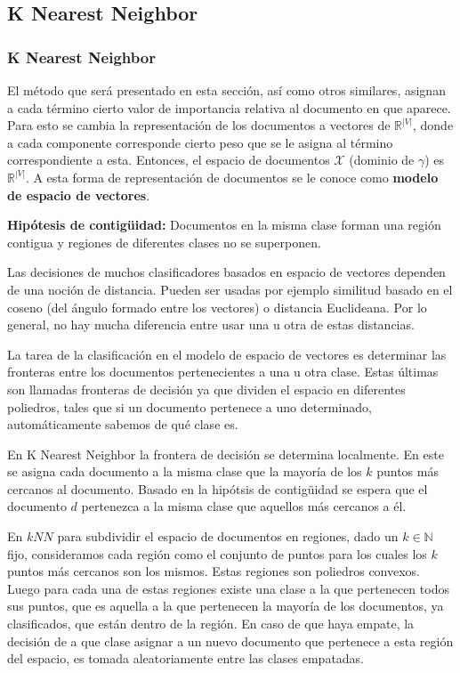 \documentclass[t,compress,10pt,xcolor=dvipsnames]{beamer}
\begin{document}
	\subsection{K Nearest Neighbor}
	\frame[allowframebreaks, c]
		\frametitle{K Nearest Neighbor}
				
		
			El m\'etodo que ser\'a presentado en esta secci\'on, as\'i como otros similares, asignan a cada t\'ermino cierto valor de importancia relativa al documento en que aparece. Para esto se cambia la representaci\'on de los documentos a vectores de $\mathbb{R}^{|V|}$, donde a cada componente corresponde cierto peso que se le asigna al t\'ermino correspondiente a esta. Entonces, el espacio de documentos $\mathcal{X}$ (dominio de $\gamma$) es $\mathbb{R}^{|V|}$. A esta forma de representaci\'on de documentos se le conoce como \textbf{modelo de espacio de vectores}.
			
		\framebreak		
			
			\textbf{Hip\'otesis de contig\"uidad:} Documentos en la misma clase forman una regi\'on contigua  y regiones de diferentes clases no se superponen.
			
		\framebreak	
				
			Las decisiones de muchos clasificadores basados en espacio de vectores dependen de una noci\'on de distancia. Pueden ser usadas por ejemplo similitud basado en el coseno (del \'angulo formado entre los vectores) o distancia Euclideana. Por lo general, no hay mucha diferencia entre usar una u otra de estas distancias.
			
		\framebreak	
						
			La tarea de la clasificaci\'on en el modelo de espacio de vectores es determinar las fronteras entre los documentos pertenecientes a una u otra clase. Estas \'ultimas son llamadas fronteras de decisi\'on ya que dividen el espacio en diferentes poliedros, tales que si un documento pertenece a uno determinado, autom\'aticamente sabemos de qu\'e clase es. 
			
		\framebreak	
						
			En K Nearest Neighbor la frontera de decisi\'on se determina localmente. En este se asigna cada documento a la misma clase que la mayor\'ia de los $k$ puntos m\'as cercanos al documento. Basado en la hip\'otsis de contig\"uidad se espera que el documento $d$ pertenezca a la misma clase que aquellos m\'as cercanos a \'el.
			
		\framebreak	
						
			En $kNN$ para subdividir el espacio de documentos en regiones, dado un $k \in \mathbb{N}$ fijo, consideramos cada regi\'on como el conjunto de puntos para los cuales los $k$ puntos m\'as cercanos son los mismos. Estas regiones son poliedros convexos. Luego para cada una de estas regiones existe una clase a la que pertenecen todos sus puntos, que es aquella a la que pertenecen la mayor\'ia de los documentos, ya clasificados, que est\'an dentro de la regi\'on. En caso de que haya empate, la decisi\'on de a que clase asignar a un nuevo documento que pertenece a esta regi\'on del espacio, es tomada aleatoriamente entre las clases empatadas.
			
\end{document}
